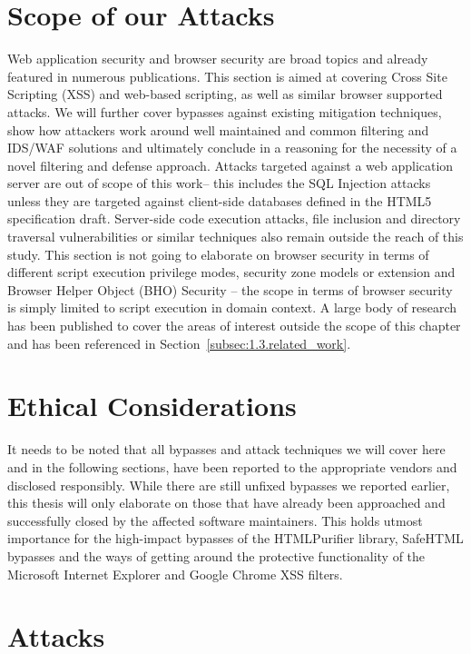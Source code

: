   \section{Scope of our Attacks}
  \label{subsec:5.2.scope}

  Web application security and browser security are broad topics and already featured in numerous publications. This section is aimed at covering Cross Site Scripting (XSS) and web-based scripting, as well as similar browser supported attacks. We will further cover bypasses against existing mitigation techniques, show how attackers work around well maintained and common filtering and IDS/WAF solutions and ultimately conclude in a reasoning for the necessity of a novel filtering and defense approach. Attacks targeted against a web application server are out of scope of this work-- this includes the SQL Injection attacks unless they are targeted against client-side databases defined in the HTML5 specification draft. Server-side code execution attacks, file inclusion and directory traversal vulnerabilities or similar techniques also remain outside the reach of this study. This section is not going to elaborate on browser security in terms of different script execution privilege modes, security zone models or 
extension and Browser Helper Object (BHO) Security -- the scope in terms of browser security is simply limited to script execution in domain context. A large body of research has been published to cover the areas of interest outside the scope of this chapter and has been referenced in Section~\ref{subsec:1.3.related_work}.

  \section{Ethical Considerations}
  \label{subsec:5.3.ethical_considerations}

  It needs to be noted that all bypasses and attack techniques we will cover here and in the following sections, have been reported to the appropriate vendors and disclosed responsibly. While there are still unfixed bypasses we reported earlier, this thesis will only elaborate on those that have already been approached and successfully closed by the affected software maintainers. This holds utmost importance for the high-impact bypasses of the HTMLPurifier library, SafeHTML bypasses and the ways of getting around the protective functionality of the Microsoft Internet Explorer and Google Chrome XSS filters.

  \section{Attacks}
  \label{subsec:5.4.attacks}


